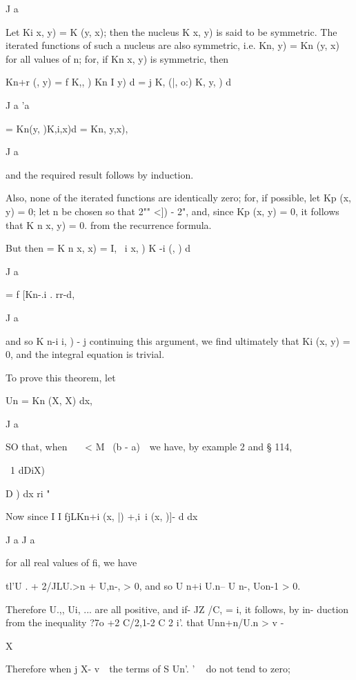 {J a

%
%


Let Ki x, y) = K (y, x); then the nucleus K x, y) is said to be
symmetric. The iterated functions of such a nucleus are also
symmetric, i.e. Kn, y) = Kn (y, x) for all values of n; for, if Kn
x, y) is symmetric, then

Kn+r (, y) = f K,, ) Kn I y) d = j K, (|, o:) K, y, ) d

J a 'a

= Kn(y, )K,i,x)d = Kn, y,x),

J a

and the required result follows by induction.

Also, none of the iterated functions are identically zero; for, if
possible, let Kp (x, y) = 0; let n be chosen so that 2"" <]) - 2",
and, since Kp (x, y) = 0, it follows that K n x, y) = 0. from the
recurrence formula.

But then = K n x, x) = I, \ i x, ) K -i (, ) d

J a

= f [Kn-.i . rr-d,

J a

and so K n-i i, ) - j continuing this argument, we find ultimately
that Ki (x, y) = 0, and the integral equation is trivial.


To prove this theorem, let

Un = Kn (X, X) dx,

J a

SO that, when \ \ \ < M~ (b - a)~\ we have, by example 2 and §
114,

\ 1 dDiX)

D ) dx ri " 

Now since I I fjLKn+i (x, |) +,i\ i (x, )]- d dx

J a J a

for all real values of fi, we have

tl'U . + 2/JLU.>n + U,n-, > 0, and so U n+i U.n-- U n-, Uon-1 > 0.

Therefore U.,, Ui, ... are all positive, and if- JZ /C, = i, it
follows, by in- duction from the inequality ?7o +2 C/2,1-2 C 2 i'.
that Unn+n/U.n > v -

X

Therefore when j X- v~\ the terms of S Un'. ' ~ do not tend to zero;

}
